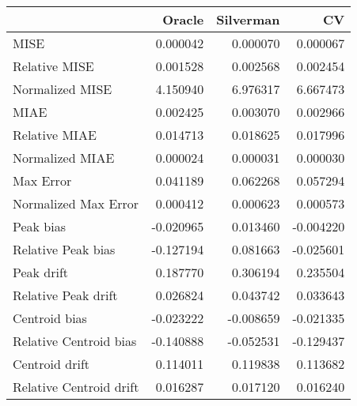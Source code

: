 \begin{tabular}{lrrr}
  \hline
 & Oracle & Silverman & CV \\ 
  \hline
MISE & 0.000042 & 0.000070 & 0.000067 \\ 
  Relative MISE & 0.001528 & 0.002568 & 0.002454 \\ 
  Normalized MISE & 4.150940 & 6.976317 & 6.667473 \\ 
  MIAE & 0.002425 & 0.003070 & 0.002966 \\ 
  Relative MIAE & 0.014713 & 0.018625 & 0.017996 \\ 
  Normalized MIAE & 0.000024 & 0.000031 & 0.000030 \\ 
  Max Error & 0.041189 & 0.062268 & 0.057294 \\ 
  Normalized Max Error & 0.000412 & 0.000623 & 0.000573 \\ 
  Peak bias & -0.020965 & 0.013460 & -0.004220 \\ 
  Relative Peak bias & -0.127194 & 0.081663 & -0.025601 \\ 
  Peak drift & 0.187770 & 0.306194 & 0.235504 \\ 
  Relative Peak drift & 0.026824 & 0.043742 & 0.033643 \\ 
  Centroid bias & -0.023222 & -0.008659 & -0.021335 \\ 
  Relative Centroid bias & -0.140888 & -0.052531 & -0.129437 \\ 
  Centroid drift & 0.114011 & 0.119838 & 0.113682 \\ 
  Relative Centroid drift & 0.016287 & 0.017120 & 0.016240 \\ 
   \hline
\end{tabular}
